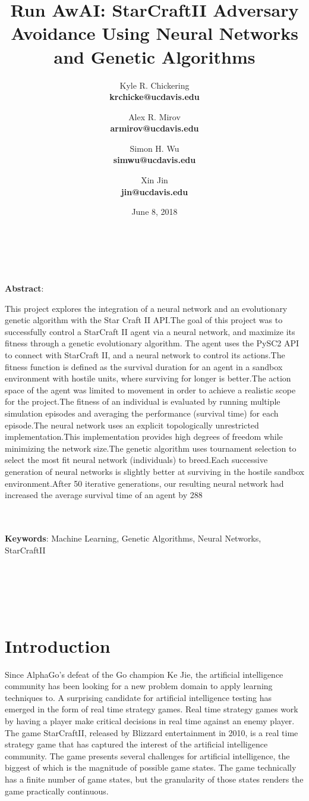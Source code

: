 \documentclass{article}
\title{Run AwAI: StarCraftII Adversary Avoidance Using Neural Networks and
  Genetic Algorithms}
\author{
    Kyle R. Chickering \\ {\footnotesize\textbf{krchicke@ucdavis.edu}}
    \and Alex R. Mirov \\ {\footnotesize\textbf{armirov@ucdavis.edu}}
    \and Simon H. Wu \\   {\footnotesize\textbf{simwu@ucdavis.edu}}
    \and Xin Jin \\       {\footnotesize\textbf{jin@ucdavis.edu}}
}
\date{June 8, 2018}
\renewenvironment{abstract}
{
\begin{changemargin}{0.5in}{0.5in}
}
{
\end{changemargin}
}
\begin{document}
\maketitle
\hline
\\~\\

\begin{abstract}
  \textbf{Abstract}: 

  This project explores the integration of a neural network and an evolutionary
  genetic algorithm with the Star Craft II API.The goal of this project was to
  successfully control a StarCraft II agent via a neural network, and maximize
  its fitness through a genetic evolutionary algorithm. The agent uses the PySC2
  API to connect with StarCraft II, and a neural network to control its
  actions.The fitness function is defined as the survival duration for an agent
  in a sandbox environment with hostile units, where surviving for longer is
  better.The action space of the agent was limited to movement in order to
  achieve a realistic scope for the project.The fitness of an individual is
  evaluated by running multiple simulation episodes and averaging the
  performance (survival time) for each episode.The neural network uses an
  explicit topologically unrestricted implementation.This implementation
  provides high degrees of freedom while minimizing the network size.The genetic
  algorithm uses tournament selection to select the most fit neural network
  (individuals) to breed.Each successive generation of neural networks is
  slightly better at surviving in the hostile sandbox environment.After 50
  iterative generations, our resulting neural network had increased the average
  survival time of an agent by 288%
  
  \\~\\
  \textbf{Keywords}: Machine Learning, Genetic Algorithms, Neural Networks,
  StarCraftII
\end{abstract}
\\~\\
\hline
\\~\\

\section{Introduction}
Since AlphaGo's defeat of the Go champion Ke Jie, the artificial intelligence
community has
been looking for a new problem domain to apply learning techniques to. A
surprising candidate for artificial intelligence testing has
emerged in the form of real time strategy games. Real time strategy games work
by having a player make critical decisions in real time against an enemy
player. The game StarCraftII, released by Blizzard entertainment in 2010, is a
real time strategy
game that has captured the interest of the artificial intelligence community.
The game presents several challenges for artificial intelligence, the biggest of
which is the magnitude of possible game states. The game technically has a
finite number of game states, but the granularity of those states renders the
game practically continuous.
\end{document}
